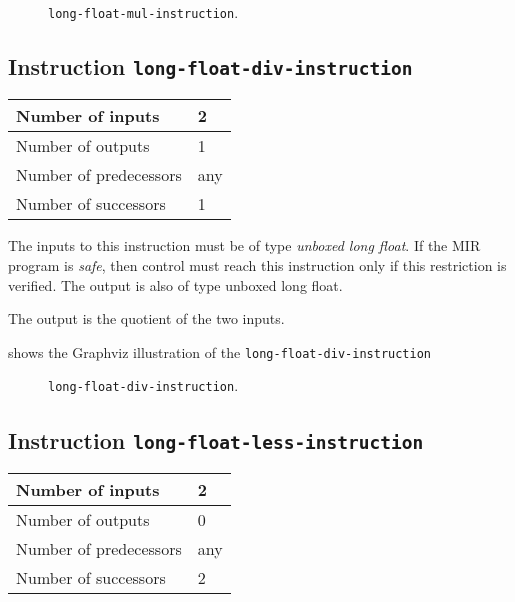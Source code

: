 \begin{figure}
\begin{center}
\end{center}
\caption{\label{fig-long-float-mul-instruction}
\texttt{long-float-mul-instruction}.}
\end{figure}

\subsection{Instruction \texttt{long-float-div-instruction}}
\label{mir-instruction-long-float-div}

\begin{tabular}{|l|l|}
\hline
Number of inputs & 2\\
\hline
Number of outputs & 1\\
\hline
Number of predecessors & any\\
\hline
Number of successors & 1\\
\hline
\end{tabular}

The inputs to this instruction must be of type \emph{unboxed long
  float}.  If the MIR program is \emph{safe}, then control must reach
this instruction only if this restriction is verified.  The output is
also of type unboxed long float.

The output is the quotient of the two inputs.

 shows the Graphviz illustration of the
\texttt{long-float-div-instruction}

\begin{figure}
\begin{center}
\end{center}
\caption{\label{fig-long-float-div-instruction}
\texttt{long-float-div-instruction}.}
\end{figure}

\subsection{Instruction \texttt{long-float-less-instruction}}
\label{mir-instruction-long-float-less}

\begin{tabular}{|l|l|}
\hline
Number of inputs & 2\\
\hline
Number of outputs & 0\\
\hline
Number of predecessors & any\\
\hline
Number of successors & 2\\
\hline
\end{tabular}

